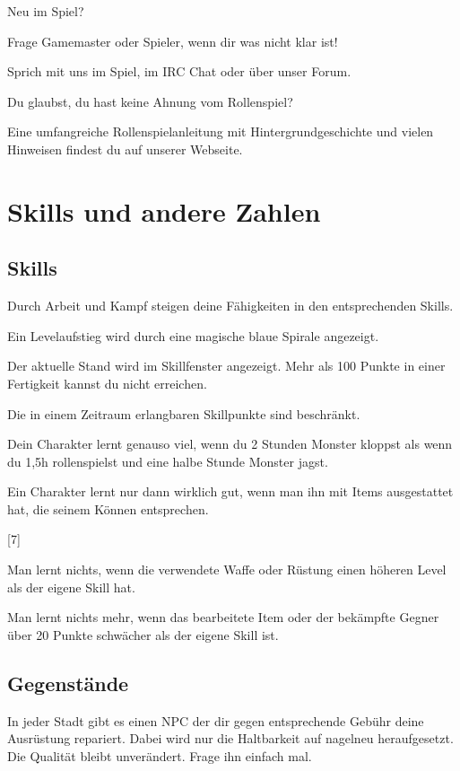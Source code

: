 \documentclass[a4paper,11pt]{book}
\begin{document}
Neu im Spiel?

Frage Gamemaster oder Spieler, wenn dir was nicht klar ist!

Sprich mit uns im Spiel, im IRC Chat oder über unser Forum.

Du glaubst, du hast keine Ahnung vom Rollenspiel?



Eine umfangreiche Rollenspielanleitung mit Hintergrundgeschichte und vielen Hinweisen findest du auf unserer Webseite.



\chapter{Skills und andere Zahlen}

\section{Skills}

Durch Arbeit und Kampf steigen deine Fähigkeiten in den entsprechenden Skills.

Ein Levelaufstieg wird durch eine magische blaue Spirale angezeigt.

Der aktuelle Stand wird im Skillfenster angezeigt. Mehr als 100 Punkte in einer Fertigkeit kannst du nicht erreichen.

Die in einem Zeitraum erlangbaren Skillpunkte sind beschränkt.

Dein Charakter lernt genauso viel, wenn du 2 Stunden Monster kloppst als  wenn du 1,5h rollenspielst und eine halbe Stunde Monster jagst.

Ein Charakter lernt nur dann wirklich gut, wenn man ihn mit Items ausgestattet hat, die seinem Können entsprechen.

[7]

Man lernt nichts, wenn die verwendete Waffe oder Rüstung einen höheren Level als der eigene Skill hat.

Man lernt nichts mehr, wenn das bearbeitete Item oder der bekämpfte Gegner über 20 Punkte schwächer als der eigene Skill ist.

\section{Gegenstände}

In jeder Stadt gibt es einen NPC der dir gegen entsprechende Gebühr deine Ausrüstung repariert. Dabei wird nur die Haltbarkeit auf nagelneu heraufgesetzt. Die Qualität bleibt unverändert. Frage ihn einfach mal.
\end{document}
